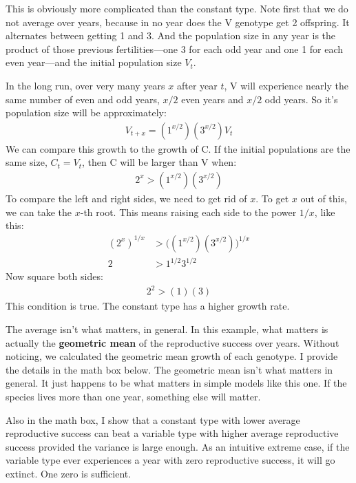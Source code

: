 \documentclass[10pt,reqno]{amsbook}
\newcommand{\bemph}[1]{{\textbf{\textcolor{bemphcol}{#1}}}}
\numberwithin{equation}{chapter}
\begin{document}
This is obviously more complicated than the constant type. Note first that we do not average over years, because in no year does the V genotype get 2 offspring. It alternates between getting 1 and 3. And the population size in any year is the product of those previous fertilities---one 3 for each odd year and one 1 for each even year---and the initial population size $V_t$.

In the long run, over very many years $x$ after year $t$, V will experience nearly the same number of even and odd years, $x/2$ even years and $x/2$ odd years. So it's population size will be approximately:
\begin{align*}
	V_{t+x} = (1^{x/2}) (3^{x/2}) V_t
\end{align*}
We can compare this growth to the growth of C. If the initial populations are the same size, $C_t=V_t$, then C will be larger than V when:
\begin{align*}
	2^x > (1^{x/2}) (3^{x/2})
\end{align*}
To compare the left and right sides, we need to get rid of $x$. To get $x$ out of this, we can take the $x$-th root. This means raising each side to the power $1/x$, like this:
\begin{align*}
	(2^x)^{1/x}  &>  \big( (1^{x/2}) (3^{x/2}) \big)^{1/x} \\
	2 &> 1^{1/2} 3^{1/2}
\end{align*}
Now square both sides:
\begin{align*}
	2^2 > (1)(3)
\end{align*}
This condition is true. The constant type has a higher growth rate. 

The average isn't what matters, in general. In this example, what matters is actually the \bemph{geometric mean} of the reproductive success over years. Without noticing, we calculated the geometric mean growth of each genotype. I provide the details in the math box below. The geometric mean isn't what matters in general. It just happens to be what matters in simple models like this one. If the species lives more than one year, something else will matter. 

Also in the math box, I show that a constant type with lower average reproductive success can beat a variable type with higher average reproductive success provided the variance is large enough. As an intuitive extreme case, if the variable type ever experiences a year with zero reproductive success, it will go extinct. One zero is sufficient.
\end{document}
